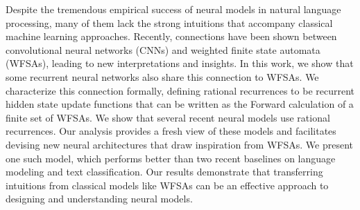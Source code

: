 Despite the tremendous empirical success of neural models in natural language processing, many of them lack the strong intuitions that accompany classical machine learning approaches. Recently, connections have been shown between convolutional neural networks (CNNs) and weighted finite state automata (WFSAs), leading to new interpretations and insights. In this work, we show that some recurrent neural networks also share this connection to WFSAs. We characterize this connection formally, defining rational recurrences to be recurrent hidden state update functions that can be written as the Forward calculation of a finite set of WFSAs. We show that several recent neural models use rational recurrences. Our analysis provides a fresh view of these models and facilitates devising new neural architectures that draw inspiration from WFSAs. We present one such model, which performs better than two recent baselines on language modeling and text classification. Our results demonstrate that transferring intuitions from classical models like WFSAs can be an effective approach to designing and understanding neural models.

